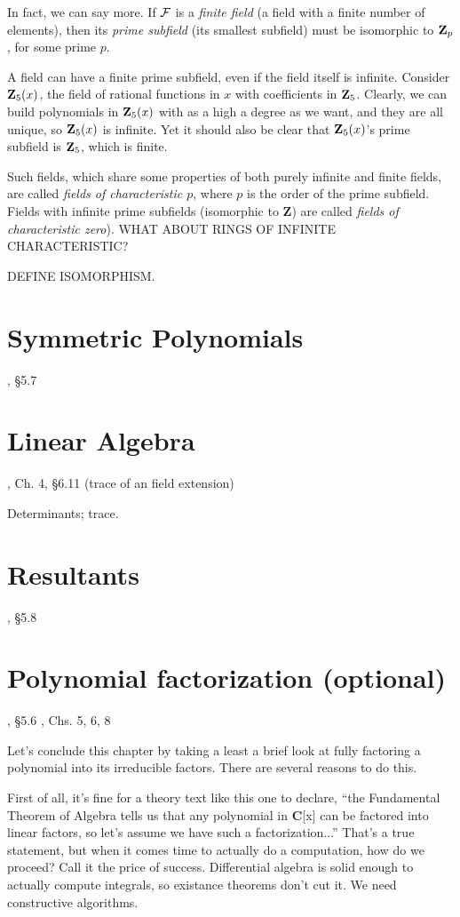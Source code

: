In fact, we can say more.  If ${\cal F}$ is a {\it finite field} (a
field with a finite number of elements), then its {\it prime subfield}
(its smallest subfield) must be isomorphic to ${\bf Z}_p$,
for some prime $p$.

A field can have a finite prime subfield, even if the field itself is
infinite.  Consider ${\bf Z}_5(x)$, the field of rational functions in
$x$ with coefficients in ${\bf Z}_5$.  Clearly, we can build
polynomials in ${\bf Z}_5(x)$ with as a high a degree as we want, and
they are all unique, so ${\bf Z}_5(x)$ is infinite.  Yet it
should also be clear that ${\bf Z}_5(x)$'s prime subfield
is ${\bf Z}_5$, which is finite.

Such fields, which share some properties of both purely infinite and
finite fields, are called {\it fields of characteristic $p$}, where
$p$ is the order of the prime subfield.  Fields with infinite prime
subfields (isomorphic to {\bf Z}) are called {\it fields of
characteristic zero}).  WHAT ABOUT RINGS OF INFINITE CHARACTERISTIC?

DEFINE ISOMORPHISM.

\section{Symmetric Polynomials}
, \S5.7

\section{Linear Algebra}
, Ch. 4, \S6.11 (trace of an field extension)

Determinants; trace.

\section{Resultants}
, \S5.8

\section{Polynomial factorization (optional)}
, \S5.6
\hbox{}\qquad [Geddes], Chs. 5, 6, 8

Let's conclude this chapter by taking a least a brief look at fully
factoring a polynomial into its irreducible factors.  There are
several reasons to do this.

First of all, it's fine for a theory text like this one to declare,
``the Fundamental Theorem of Algebra tells us that any polynomial in
{\bf C}[x] can be factored into linear factors, so let's assume we
have such a factorization...''  That's a true statement, but when it
comes time to actually do a computation, how do we proceed?  Call it
the price of success.  Differential algebra is solid enough to
actually compute integrals, so existance theorems don't cut it.  We
need constructive algorithms.

